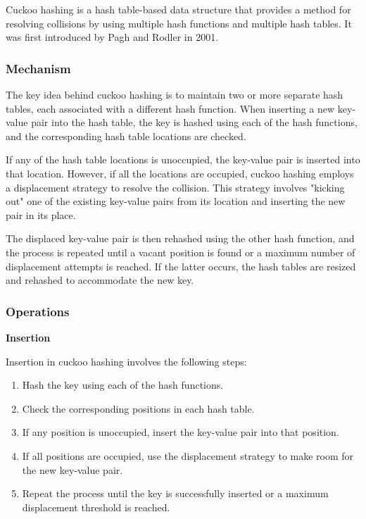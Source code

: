 \documentclass[12pt]{article}
\begin{document}
Cuckoo hashing is a hash table-based data structure that provides a method for resolving collisions by using multiple hash functions and multiple hash tables. It was first introduced by Pagh and Rodler in 2001.

\subsubsection{Mechanism}
The key idea behind cuckoo hashing is to maintain two or more separate hash tables, each associated with a different hash function. When inserting a new key-value pair into the hash table, the key is hashed using each of the hash functions, and the corresponding hash table locations are checked.

If any of the hash table locations is unoccupied, the key-value pair is inserted into that location. However, if all the locations are occupied, cuckoo hashing employs a displacement strategy to resolve the collision. This strategy involves "kicking out" one of the existing key-value pairs from its location and inserting the new pair in its place.

The displaced key-value pair is then rehashed using the other hash function, and the process is repeated until a vacant position is found or a maximum number of displacement attempts is reached. If the latter occurs, the hash tables are resized and rehashed to accommodate the new key.

\subsubsection{Operations}

\textbf{Insertion}

Insertion in cuckoo hashing involves the following steps:

\begin{enumerate}
    \item Hash the key using each of the hash functions.
    \item Check the corresponding positions in each hash table.
    \item If any position is unoccupied, insert the key-value pair into that position.
    \item If all positions are occupied, use the displacement strategy to make room for the new key-value pair.
    \item Repeat the process until the key is successfully inserted or a maximum displacement threshold is reached.
\end{enumerate}
\newpage
\end{document}
